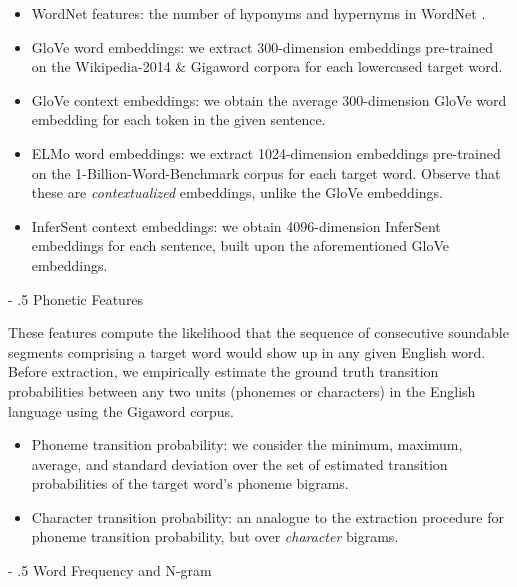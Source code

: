 \documentclass[11pt,a4paper]{article}
\makeatletter
\renewcommand\paragraph{%
    \@startsection{paragraph}{4}{0mm}%
        {-\baselineskip}%
        {.5\baselineskip}%
        {\normalfont\normalsize\bfseries}}
\makeatother
\begin{document}
\begin{itemize}
  \item WordNet features: the number of hyponyms and hypernyms in WordNet \citep{Fellbaum:2005}.
  \item GloVe word embeddings: we extract 300-dimension embeddings pre-trained on the Wikipedia-2014 \& Gigaword corpora \citep{pennington2014glove} for each lowercased target word. 
  \item GloVe context embeddings: we obtain the average 300-dimension GloVe word embedding for each token in the given sentence.
  \item ELMo word embeddings: we extract 1024-dimension embeddings pre-trained on the 1-Billion-Word-Benchmark corpus \citep{Peters:2018} for each target word. Observe that these are \textit{contextualized} embeddings, unlike the GloVe embeddings.
  \item InferSent context embeddings: we obtain 4096-dimension InferSent embeddings \citep{conneau-EtAl:2017:EMNLP2017} for each sentence, built upon the aforementioned GloVe embeddings.
\end{itemize}

\paragraph{Phonetic Features}

These features compute the likelihood that the sequence of consecutive soundable segments comprising a target word would show up in any given English word. Before extraction, we empirically estimate the ground truth transition probabilities between any two units (phonemes or characters) in the English language using the Gigaword corpus. 

\begin{itemize}
  \item Phoneme transition probability: we consider the minimum, maximum, average, and standard deviation over the set of estimated transition probabilities of the target word's phoneme bigrams.
  \item Character transition probability: an analogue to the extraction procedure for phoneme transition probability, but over \textit{character} bigrams.
\end{itemize}

\paragraph{Word Frequency and N-gram}
\end{document}
